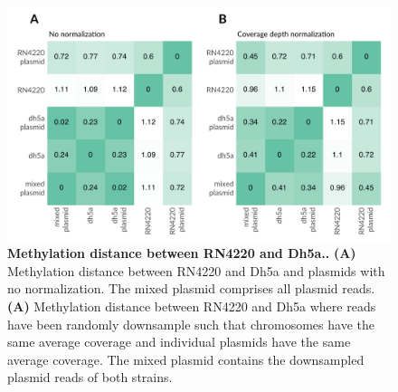 \begin{figure}[!hb]
\centering
\includegraphics[width = 1\linewidth,keepaspectratio]{figure/bheatmaps.pdf}
\caption[Methylation distance between RN4220 and Dh5a.]{{\bf Methylation distance between RN4220 and Dh5a..} {\bf (A)} Methylation distance between RN4220 and Dh5a and plasmids with no normalization. The mixed plasmid comprises all plasmid reads. {\bf (A)} Methylation distance between RN4220 and Dh5a where reads have been randomly downsample such that chromosomes have the same average coverage and individual plasmids have the same average coverage. The mixed plasmid contains the downsampled plasmid reads of both strains. }
\label{fig:bheatmaps}
\end{figure}


